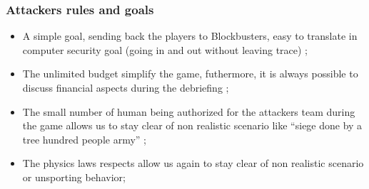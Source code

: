 \documentclass[11pt]{article} %
\begin{document}
\subsubsection{Attackers rules and goals}
\begin{itemize}
\item A simple goal, sending back the players to Blockbusters, easy to translate in computer 
security goal (going in and out without leaving trace) ;
\item The unlimited budget simplify the game, futhermore, it is always possible to discuss 
financial aspects during the debriefing ;
\item The small number of human being authorized for the attackers team during the game 
allows us to stay clear of non realistic scenario like ``siege done by a tree hundred people army'' ;
\item The physics laws respects allow us again to stay clear of non realistic scenario or 
unsporting behavior;
\end{itemize}

\end{document}
